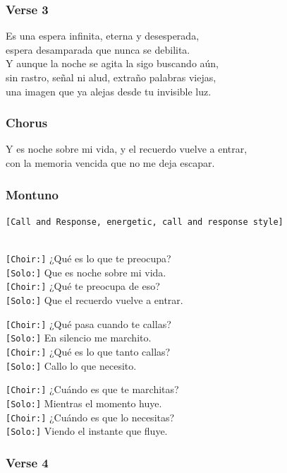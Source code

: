 \documentclass[]{article}
\begin{document}
\subsubsection{Verse 3}\label{verse-3-8}

Es una espera infinita, eterna y desesperada,\\
espera desamparada que nunca se debilita.\\
Y aunque la noche se agita la sigo buscando aún,\\
sin rastro, señal ni alud, extraño palabras viejas,\\
una imagen que ya alejas desde tu invisible luz.

\subsubsection{Chorus}\label{chorus-57}

Y es noche sobre mi vida, y el recuerdo vuelve a entrar,\\
con la memoria vencida que no me deja escapar.

\subsubsection{Montuno}\label{montuno}

\texttt{{[}Call\ and\ Response,\ energetic,\ call\ and\ response\ style{]}}\strut \\
\texttt{{[}Choir:{]}} ¿Qué es lo que te preocupa?\\
\texttt{{[}Solo:{]}} Que es noche sobre mi vida.\\
\texttt{{[}Choir:{]}} ¿Qué te preocupa de eso?\\
\texttt{{[}Solo:{]}} Que el recuerdo vuelve a entrar.

\texttt{{[}Choir:{]}} ¿Qué pasa cuando te callas?\\
\texttt{{[}Solo:{]}} En silencio me marchito.\\
\texttt{{[}Choir:{]}} ¿Qué es lo que tanto callas?\\
\texttt{{[}Solo:{]}} Callo lo que necesito.

\texttt{{[}Choir:{]}} ¿Cuándo es que te marchitas?\\
\texttt{{[}Solo:{]}} Mientras el momento huye.\\
\texttt{{[}Choir:{]}} ¿Cuándo es que lo necesitas?\\
\texttt{{[}Solo:{]}} Viendo el instante que fluye.

\subsubsection{Verse 4}\label{verse-4-6}
\end{document}
